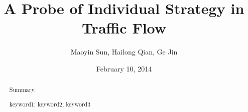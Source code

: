 \documentclass[a4paper,11pt]{article}
\title{A Probe of Individual Strategy in Traffic Flow}
\author{\small {Maoyin Sun, Hailong Qian, Ge Jin}}
\date{February 10, 2014}
\begin{document}
\begin{abstract}
Summary. 
\begin{keywords}
keyword1; keyword2; keyword3
\end{keywords}
\end{abstract}

\maketitle

\end{document}
